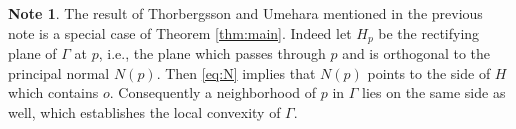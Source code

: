 \documentclass[11pt]{amsart}
\theoremstyle{definition}
\newtheorem{note}[thm]{Note}
\renewcommand{\(}{\left(}
\renewcommand{\)}{\right)}
\begin{document}
\begin{note}\label{note:TU2}
The result of Thorbergsson and Umehara  \cite[Thm. 0.2]{thorbergsson&umehara}  mentioned in the previous note is a special case of Theorem \ref{thm:main}. Indeed let $H_p$ be the rectifying plane of $\Gamma$ at $p$, i.e., the plane which passes through $p$ and is orthogonal to the principal normal $N(p)$. Then \eqref{eq:N} implies that $N(p)$ points to the side of $H$ which contains $o$. Consequently a neighborhood of $p$ in $\Gamma$ lies on the same side as well, which establishes the local convexity of $\Gamma$.
\begin{comment}
 (let $\gamma\colon (-\epsilon,\epsilon)\to\Gamma$ be a local unit speed parametrization with $\gamma(0)=p$, and $f(t):=\langle \gamma(t)-p,N(p)\rangle$; by Taylor's theorem, $f(t)=\|\gamma''(s)\|\langle N(s), N(0)\rangle t^2/2$ for some $s\in(0,t)$, which yields $f\geq 0$ for small $t$)
\end{comment}
\end{note}
\end{document}
